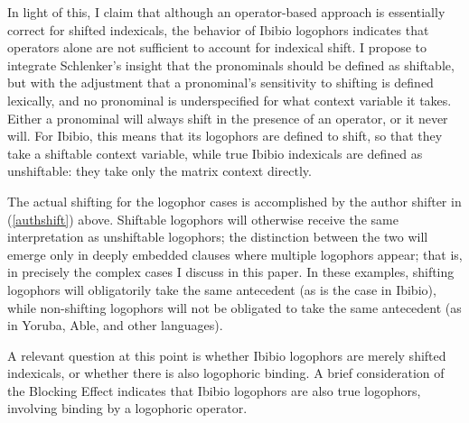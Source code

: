 \documentclass[output=paper]{langscibook}
\begin{document}
In light of this, I claim that although an operator-based approach is essentially correct for shifted indexicals, the behavior of Ibibio logophors indicates that operators alone are not sufficient to account for indexical shift. I propose to integrate Schlenker's insight that the pronominals should be defined as shiftable, but with the adjustment that a pronominal's sensitivity to shifting is defined lexically, and no pronominal is underspecified for what context variable it takes. Either a pronominal will always shift in the presence of an operator, or it never will. For Ibibio, this means that its logophors are defined to shift, so that they take a shiftable context variable, while true Ibibio indexicals are defined as unshiftable: they take only the matrix context directly.
\begin{exe}
	\ex \begin{xlist}
	\end{xlist}
\end{exe}
The actual shifting for the logophor cases is accomplished by the author shifter in (\ref{authshift}) above. Shiftable logophors will otherwise receive the same interpretation as unshiftable logophors; the distinction between the two will emerge only in deeply embedded clauses where multiple logophors appear; that is, in precisely the complex cases I discuss in this paper. In these examples, shifting logophors will obligatorily take the same antecedent (as is the case in Ibibio), while non-shifting logophors will not be obligated to take the same antecedent (as in Yoruba, Able, and other languages).

A relevant question at this point is whether Ibibio logophors are merely shifted indexicals, or whether there is also logophoric binding. A brief consideration of the  Blocking Effect indicates that Ibibio logophors are also true logophors, involving binding by a logophoric operator.
\end{document}
